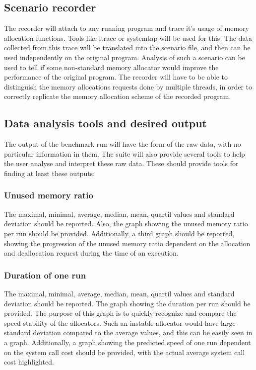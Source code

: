 \subsection{Scenario recorder}

The recorder will attach to any running program and trace it's usage of memory
allocation functions. Tools like ltrace \cite{tools:ltrace} or systemtap
\cite{tools:systemtap} will be used for this. The data collected from this trace
will be translated into the scenario file, and then can be used independently on
the original program. Analysis of such a scenario can be used to tell if some
non-standard memory allocator would improve the performance of the original
program. The recorder will have to be able to distinguish the memory allocations
requests done by multiple threads, in order to correctly replicate the memory
allocation scheme of the recorded program.

\subsection{Data analysis tools and desired output}

The output of the benchmark run will have the form of the raw data, with no
particular information in them. The suite will also provide several tools to help
the user analyse and interpret these raw data. These should provide tools for
finding at least these outputs:

\subsubsection{Unused memory ratio}
The maximal, minimal, average, median, mean, quartil
values and standard deviation should be reported. Also, the graph showing the
unused memory ratio per run should be provided. Additionally, a third graph
should be reported, showing the progression of the unused memory ratio dependent
on the allocation and deallocation request during the time of an execution.
\subsubsection{Duration of one run}
The maximal, minimal, average, median, mean, quartil
values and standard deviation should be reported. The graph showing the duration
per run should be provided. The purpose of this graph is to quickly recognize and
compare the speed stability of the allocators. Such an instable allocator would
have large standard deviation compared to the average values, and this can be
easily seen in a graph. Additionally, a graph showing the predicted speed of one
run dependent on the system call cost should be provided, with the actual average
system call cost highlighted.
